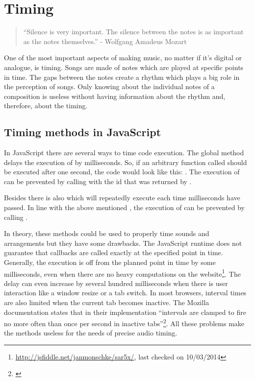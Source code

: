 
\section{Timing}
\label{sec:webaudio-timing}

\begin{quote}
  ``Silence is very important. The silence between the notes is as important as the notes themselves.'' - Wolfgang Amadeus Mozart
\end{quote}

One of the most important aspects of making music, no matter if it's digital or analogue, is timing. Songs are made of notes which are played at specific points in time. The gaps between the notes create a rhythm which plays a big role in the perception of songs. Only knowing about the individual notes of a composition is useless without having information about the rhythm and, therefore, about the timing.

\subsection{Timing methods in JavaScript}
\label{subsec:timing-in-js}

In JavaScript there are several ways to time code execution. The global method  \cite[chapter: setTimeout]{MDN} delays the execution of  by  milliseconds. So, if an arbitrary function called  should be executed after one second, the code would look like this: . The execution of  can be prevented by calling  with the id that was returned by .

Besides  there is also  \cite[chapter: setInterval]{MDN} which will repeatedly execute  each time  milliseconds have passed. In line with the above mentioned , the execution of  can be prevented by calling .

In theory, these methods could be used to properly time sounds and arrangements but they have some drawbacks. The JavaScript runtime does not guarantee that callbacks are called exactly at the specified point in time. Generally, the execution is off from the planned point in time by some milliseconds, even when there are no heavy computations on the website\footnote{\url{http://jsfiddle.net/janmonschke/sar5x/}, last checked on 10/03/2014}. The delay can even increase by several hundred milliseconds when there is user interaction like a window resize or a tab switch. In most browsers, interval times are also limited when the current tab becomes inactive. The Mozilla documentation states that in their implementation ``intervals are clamped to fire no more often than once per second in inactive tabs''\footnote{\cite[chapter: setInterval]{MDN}}. All these problems make the methods useless for the needs of precise audio timing. 

